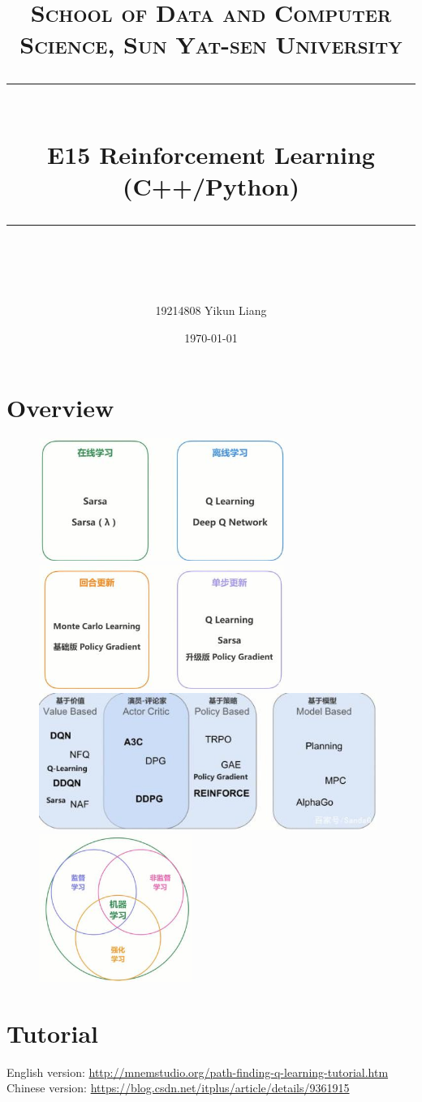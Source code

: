 \documentclass[a4paper, 11pt]{article}
\title{	
\normalfont \normalsize
\textsc{School of Data and Computer Science, Sun Yat-sen University} \\ [25pt] %
\rule{\textwidth}{0.5pt} \\[0.4cm] %
\huge  E15 Reinforcement Learning (C++/Python)\\ %
\rule{\textwidth}{2pt} \\[0.5cm] %
\author{19214808 Yikun Liang}
\date{\normalsize\today}
}
\begin{document}
\maketitle
\tableofcontents
\newpage
\section{Overview}
\begin{figure}[ht]
\centering
\includegraphics[width=8cm]{Pic/on_off}
\quad
\includegraphics[width=8cm]{Pic/update}
\includegraphics[width=11cm]{Pic/base}
\quad
\includegraphics[width=5cm]{Pic/relation}
\end{figure}
\section{Tutorial}
English version: \url{http://mnemstudio.org/path-finding-q-learning-tutorial.htm}\\
Chinese version: \url{https://blog.csdn.net/itplus/article/details/9361915}
\end{document}
